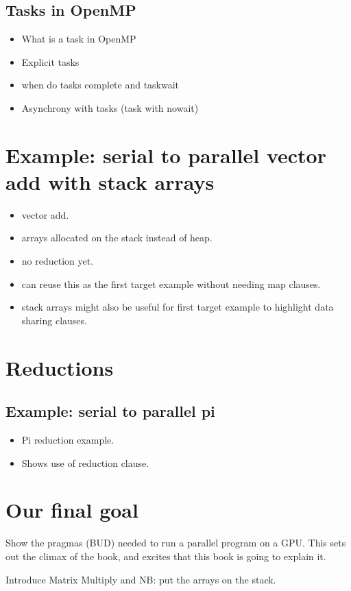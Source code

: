 \subsection{Tasks in OpenMP}
\begin{itemize}
   \item What is a task in OpenMP
   \item Explicit tasks 
   \item when do tasks complete and taskwait
   \item Asynchrony with tasks (task with nowait)
\end{itemize}

\section{Example: serial to parallel vector add with stack arrays}
\begin{itemize}
  \item vector add.
  \item arrays allocated on the stack instead of heap.
  \item no reduction yet.
  \item can reuse this as the first target example without needing map clauses.
  \item stack arrays might also be useful for first target example to highlight data sharing clauses.
\end{itemize}

\section{Reductions}
\label{sec:reduction}
\subsection{Example: serial to parallel pi}
\begin{itemize}
  \item Pi reduction example.
  \item Shows use of reduction clause.
\end{itemize}

\section{Our final goal}
Show the pragmas (BUD) needed to run a parallel program on a GPU.
This sets out the climax of the book, and excites that this book is going to explain it.


Introduce Matrix Multiply and
NB: put the arrays on the stack.




